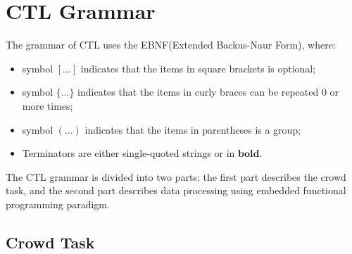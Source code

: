 \chapter{CTL Grammar}
The grammar of CTL uses the EBNF(Extended Backus-Naur Form), where:
\begin{itemize}
    \item symbol $[\dots]$ indicates that the items in square brackets is optional;
    \item symbol $\{\dots\}$ indicates that the items in curly braces can be repeated 0 or more times;
    \item symbol $(\dots)$ indicates that the items in parentheses is a group;
    \item Terminators are either single-quoted strings or in $\mathbf{bold}$.
\end{itemize}
The CTL grammar is divided into two parts: the first part describes the crowd task, and the second part describes data processing using embedded functional programming paradigm.

\section{Crowd Task}

